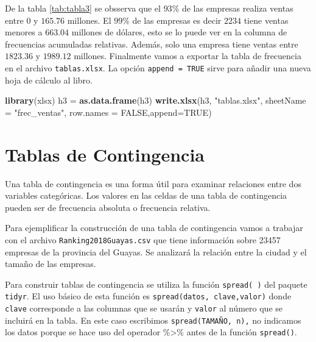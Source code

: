 \documentclass[letterpaper,]{book}
\newenvironment{Shaded}{\begin{snugshade}}{\end{snugshade}}
\newcommand{\DataTypeTok}[1]{\textcolor[rgb]{0.13,0.29,0.53}{#1}}
\newcommand{\KeywordTok}[1]{\textcolor[rgb]{0.13,0.29,0.53}{\textbf{#1}}}
\newcommand{\NormalTok}[1]{#1}
\newcommand{\OtherTok}[1]{\textcolor[rgb]{0.56,0.35,0.01}{#1}}
\newcommand{\StringTok}[1]{\textcolor[rgb]{0.31,0.60,0.02}{#1}}
\begin{document}
De la tabla \ref{tab:tabla3} se obsserva que el \(93\%\) de las empresas realiza ventas entre 0 y \(165.76\) millones. El \(99\%\) de las empresas es decir \(2234\) tiene ventas menores a \(663.04\) millones de dólares, esto se lo puede ver en la columna de frecuencias acumuladas relativas. Además, solo una empresa tiene ventas entre \(1823.36\) y \(1989.12\) millones. Finalmente vamos a exportar la tabla de frecuencia en el archivo \texttt{tablas.xlsx}. La opción \texttt{append\ =\ TRUE} sirve para añadir una nueva hoja de cálculo al libro.

\begin{Shaded}
\begin{Highlighting}[]
\KeywordTok{library}\NormalTok{(xlsx)}
\NormalTok{h3 =}\StringTok{ }\KeywordTok{as.data.frame}\NormalTok{(h3)}
\KeywordTok{write.xlsx}\NormalTok{(h3, }\StringTok{"tablas.xlsx"}\NormalTok{, }\DataTypeTok{sheetName =} \StringTok{"frec_ventas"}\NormalTok{, }\DataTypeTok{row.names =} \OtherTok{FALSE}\NormalTok{,}\DataTypeTok{append=}\OtherTok{TRUE}\NormalTok{)}
\end{Highlighting}
\end{Shaded}

\hypertarget{tablas-de-contingencia}{%
\section{Tablas de Contingencia}\label{tablas-de-contingencia}}

Una tabla de contingencia es una forma útil para examinar relaciones entre dos variables categóricas. Los valores en las celdas de una tabla de contingencia pueden ser de frecuencia absoluta o frecuencia relativa.

Para ejemplificar la construcción de una tabla de contingencia vamos a trabajar con el archivo \texttt{Ranking2018Guayas.csv} que tiene información sobre 23457 empresas de la provincia del Guayas. Se analizará la relación entre la ciudad y el tamaño de las empresas.

Para construir tablas de contingencia se utiliza la función \texttt{spread(\ )} del paquete \texttt{tidyr}. El uso básico de esta función es \texttt{spread(datos,\ clave,valor)} donde \texttt{clave} corresponde a las columnas que se usarán y \texttt{valor} al número que se incluirá en la tabla. En este caso escribimos \texttt{spread(TAMAÑO,\ n),} no indicamos los datos porque se hace uso del operador \%\textgreater{}\% antes de la función \texttt{spread()}.
\end{document}
